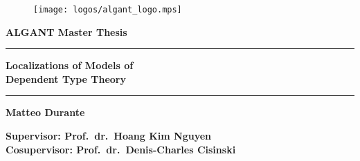\thispagestyle{empty}
\begin{titlepage}
  \begin{center}
    \begin{figure}[h!]
      \centering
      \texttt{[image: logos/algant\_logo.mps]}
    \end{figure}
    \vspace{0.4cm}
    \fontsize{15pt}{0.6cm}\selectfont
    {\textbf{ALGANT Master Thesis}}
    \vspace{0.2cm}
    \rule{\linewidth}{0.3mm}
    
    \vspace{0.05cm}
    \Huge{\textbf{Localizations of Models of
        \\ %
        Dependent Type Theory}}\\
    \vspace{0.05cm}
    
    \rule{\linewidth}{0.3mm}
    
    \vspace{0.1cm}
    
    \large{\textbf{Matteo Durante}}\\
    \vspace{0.1cm}
    
    \large{\textbf{Supervisor: Prof.\ dr.\ Hoang Kim Nguyen}} \\
    \vspace{0.1cm}
    \large{\textbf{Cosupervisor: Prof.\ dr.\ Denis-Charles Cisinski}}
    
    \vfill
    

\end{center}
\end{titlepage}
